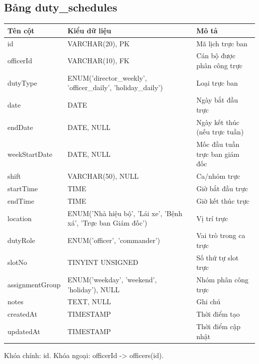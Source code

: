 \documentclass[18pt,a4paper]{report}
\begin{document}
\subsection{Bảng duty\_schedules}
\begin{longtable}{|>{\raggedright\arraybackslash}p{4.5cm}|>{\raggedright\arraybackslash}p{4.5cm}|>{\raggedright\arraybackslash}p{6.5cm}|}
\hline
\textbf{Tên cột} & \textbf{Kiểu dữ liệu} & \textbf{Mô tả} \\ \hline
id & VARCHAR(20), PK & Mã lịch trực ban \\ \hline
officerId & VARCHAR(10), FK & Cán bộ được phân công trực \\ \hline
dutyType & ENUM('director\_weekly', 'officer\_daily', 'holiday\_daily') & Loại trực ban \\ \hline
date & DATE & Ngày bắt đầu trực \\ \hline
endDate & DATE, NULL & Ngày kết thúc (nếu trực tuần) \\ \hline
weekStartDate & DATE, NULL & Mốc đầu tuần trực ban giám đốc \\ \hline
shift & VARCHAR(50), NULL & Ca/nhóm trực \\ \hline
startTime & TIME & Giờ bắt đầu trực \\ \hline
endTime & TIME & Giờ kết thúc trực \\ \hline
location & ENUM('Nhà hiệu bộ', 'Lái xe', 'Bệnh xá', 'Trực ban Giám đốc') & Vị trí trực \\ \hline
dutyRole & ENUM('officer', 'commander') & Vai trò trong ca trực \\ \hline
slotNo & TINYINT UNSIGNED & Số thứ tự slot trực \\ \hline
assignmentGroup & ENUM('weekday', 'weekend', 'holiday'), NULL & Nhóm phân công trực \\ \hline
notes & TEXT, NULL & Ghi chú \\ \hline
createdAt & TIMESTAMP & Thời điểm tạo \\ \hline
updatedAt & TIMESTAMP & Thời điểm cập nhật \\ \hline
\end{longtable}
Khóa chính: id. Khóa ngoại: officerId -> officers(id).
\end{document}
